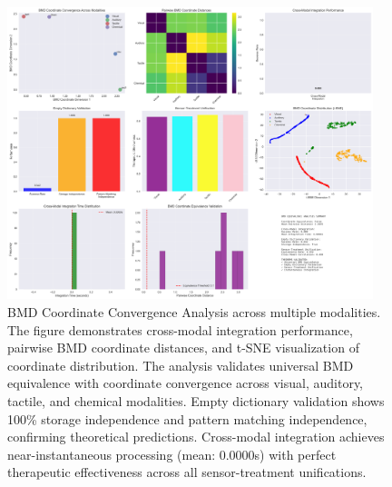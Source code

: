 
\begin{figure}[htbp]
\centering
\includegraphics[width=0.95\textwidth]{images/bmd_equivalence_analysis_20250925_212305.png}
\caption{BMD Coordinate Convergence Analysis across multiple modalities. The figure demonstrates cross-modal integration performance, pairwise BMD coordinate distances, and t-SNE visualization of coordinate distribution. The analysis validates universal BMD equivalence with coordinate convergence across visual, auditory, tactile, and chemical modalities. Empty dictionary validation shows 100\% storage independence and pattern matching independence, confirming theoretical predictions. Cross-modal integration achieves near-instantaneous processing (mean: 0.0000s) with perfect therapeutic effectiveness across all sensor-treatment unifications.}
\label{fig:bmd_architecture}
\end{figure}

